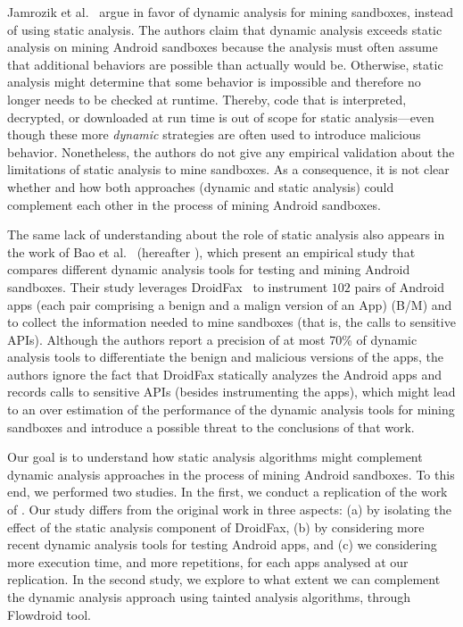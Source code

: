 Jamrozik et al.~\cite{DBLP:conf/icse/JamrozikSZ16} argue in favor of dynamic analysis for mining sandboxes, instead of using static analysis. The authors claim that dynamic analysis exceeds static analysis on mining Android sandboxes because the analysis must often assume that additional behaviors are possible than actually would be.
Otherwise, static analysis might determine that some behavior is impossible and therefore no longer needs to be checked at runtime. Thereby, code that is interpreted, decrypted, or downloaded at run time is out of scope for static analysis---even though these more \emph{dynamic} strategies are often used to introduce malicious behavior. Nonetheless, the authors do not give any empirical validation about the limitations of static analysis to mine sandboxes. As a consequence, it is not clear whether and how both approaches (dynamic and static analysis) could complement each other in the process of mining Android sandboxes.

The same lack of understanding about the role of static analysis also appears in the work of Bao et al.~\cite{DBLP:conf/wcre/BaoLL18} (hereafter \blls), which present an empirical study that compares different dynamic analysis tools for testing and mining Android sandboxes. Their study leverages DroidFax~\cite{DBLP:conf/icsm/CaiR17a} to instrument $102$ pairs of Android apps (each pair comprising a benign and a malign version of an App) (B/M) and to collect the information needed to mine sandboxes (that is, the calls to sensitive APIs).
Although the authors report a precision of at most 70\% of dynamic analysis tools to differentiate the benign and malicious versions of the apps, the authors ignore the fact that DroidFax statically analyzes the Android apps and records calls to sensitive APIs (besides instrumenting the apps), which might lead to an over estimation of the performance of the dynamic analysis tools for mining sandboxes and introduce a possible threat to the conclusions of that work.

Our goal is to understand how static analysis
algorithms might complement dynamic analysis approaches in the process of mining Android sandboxes. To this end, we performed two studies. In the
first, we conduct a replication of the work of \blls. Our study differs from the original work in three aspects: (a)
by isolating the effect of the static analysis component of DroidFax, (b) by considering more recent dynamic analysis tools for testing Android apps,
and (c) we considering more execution time, and more repetitions, for each apps analysed at our replication. In the second study, we explore to what extent we can complement the dynamic analysis approach using tainted analysis algorithms, through Flowdroid \cite{DBLP:conf/pldi/ArztRFBBKTOM14} tool.


